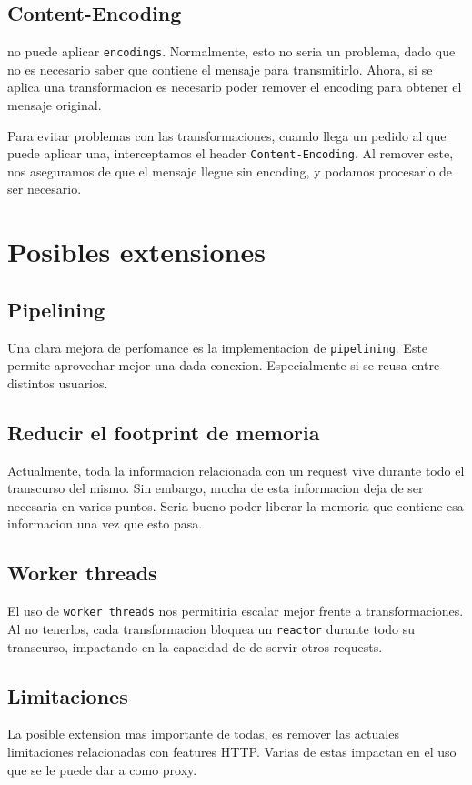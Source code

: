 \documentclass[11pt,a4paper,titlepage]{article}
\begin{document}
    \subsection{Content-Encoding}
    \duta no puede aplicar \texttt{encodings}.
    Normalmente, esto no seria un problema, dado que no es necesario saber que contiene el mensaje para transmitirlo.
    Ahora, si se aplica una transformacion es necesario poder remover el encoding para obtener el mensaje original.

    Para evitar problemas con las transformaciones, cuando llega un pedido al que puede aplicar una, interceptamos el header \texttt{Content-Encoding}.
    Al remover este, nos aseguramos de que el mensaje llegue sin encoding, y podamos procesarlo de ser necesario.


\section{Posibles extensiones}
    \subsection{Pipelining}
    Una clara mejora de perfomance es la implementacion de \texttt{pipelining}.
    Este permite aprovechar mejor una dada conexion.
    Especialmente si se reusa entre distintos usuarios.

    \subsection{Reducir el footprint de memoria}
    Actualmente, toda la informacion relacionada con un request vive durante todo el transcurso del mismo.
    Sin embargo, mucha de esta informacion deja de ser necesaria en varios puntos.
    Seria bueno poder liberar la memoria que contiene esa informacion una vez que esto pasa.

    \subsection{Worker threads}
    El uso de \texttt{worker threads} nos permitiria escalar mejor frente a transformaciones.
    Al no tenerlos, cada transformacion bloquea un \texttt{reactor} durante todo su transcurso, impactando en la capacidad de \duta de servir otros requests.

    \subsection{Limitaciones}
    La posible extension mas importante de todas, es remover las actuales limitaciones relacionadas con features HTTP.
    Varias de estas impactan en el uso que se le puede dar a \duta como proxy.
\end{document}
